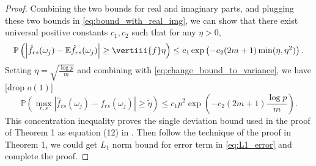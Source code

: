 \begin{proof}
Combining the two bounds for real and imaginary parts, and plugging these two bounds in  \eqref{eq:bound_with_real_img}, we can show that there exist universal positive constants $c_1, c_2$ such that for any $\eta > 0$, 
\begin{equation}\label{eqn:conc-entrywise}
\mathbb{P}\left(\left|\hat{f}_{rs}(\omega_j) - \mathbb{E}\hat{f}_{rs}(\omega_j)\right| \ge \vertiii{f}\eta\right)\le c_1\exp\left(-c_2(2m+1)\min(\eta, \eta^2)\right).
\end{equation}
Setting $\eta = \sqrt{\frac{\log p}{m}}$ and combining with   \eqref{eq:change_bound_to_variance}, we have {\color{red} [drop $o(1)$]} 
\begin{equation}
  \mathbb{P}(\max_{r, s}|\hat{f}_{rs}(\omega_j)-f_{rs}(\omega_j)|\ge \tilde{\eta}) \le c_1 p^2\exp\left(-c_2 (2m+1)\frac{\log p}{m}\right).
\end{equation}
This concentration inequality proves the single deviation bound used in the proof of Theorem 1 as equation (12) in \citet{bickel2008covariance}. Then follow the technique of the proof in Theorem 1, we could get $L_1$ norm bound for error term in \eqref{eq:L1_error} and complete the proof.
\end{proof}


